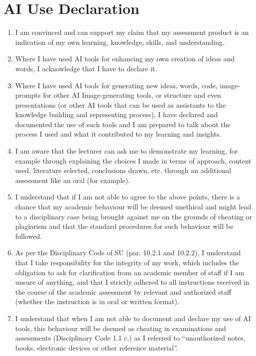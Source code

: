 \chapter*{AI Use Declaration}

{\setlength{}%
 \setlength{}%
 \setlength\itemindent{0pt}%
 \setlength{}%
 \setlength\topsep{0pt}%
 \setlength\partopsep{0pt}%
\begin{enumerate}[label=\arabic*., leftmargin=*, itemsep=\smallskipamount, topsep=0pt, parsep=0pt]
	\item I am convinced and can support my claim that my assessment product is an indication of my own learning, knowledge, skills, and understanding.
	\item Where I have used AI tools for enhancing my own creation of ideas and words, I acknowledge that I have to declare it.
	\item Where I have used AI tools for generating new ideas, words, code, image-prompts for other AI Image-generating tools, or structure and even presentations (or other AI tools that can be used as assistants to the knowledge building and representing process), I have declared and documented the use of such tools and I am prepared to talk about the process I used and what it contributed to my learning and insights.
	\item I am aware that the lecturer can ask me to demonstrate my learning, for example through explaining the choices I made in terms of approach, content used, literature selected, conclusions drawn, etc. through an additional assessment like an oral (for example).
	\item I understand that if I am not able to agree to the above points, there is a chance that my academic behaviour will be deemed unethical and might lead to a disciplinary case being brought against me on the grounds of cheating or plagiarism and that the standard procedures for such behaviour will be followed.
	\item As per the Disciplinary Code of SU (par. 10.2.1 and 10.2.2), I understand that I take responsibility for the integrity of my work, which includes the obligation to ask for clarification from an academic member of staff if I am unsure of anything, and that I strictly adhered to all instructions received in the course of the academic assessment by relevant and authorized staff (whether the instruction is in oral or written format).
	\item I understand that when I am not able to document and declare my use of AI tools, this behaviour will be deemed as cheating in examinations and assessments (Disciplinary Code 1.1 c.) as I referred to “unauthorized notes, books, electronic devices or other reference material”.
\end{enumerate}
\vspace{10mm}

}
